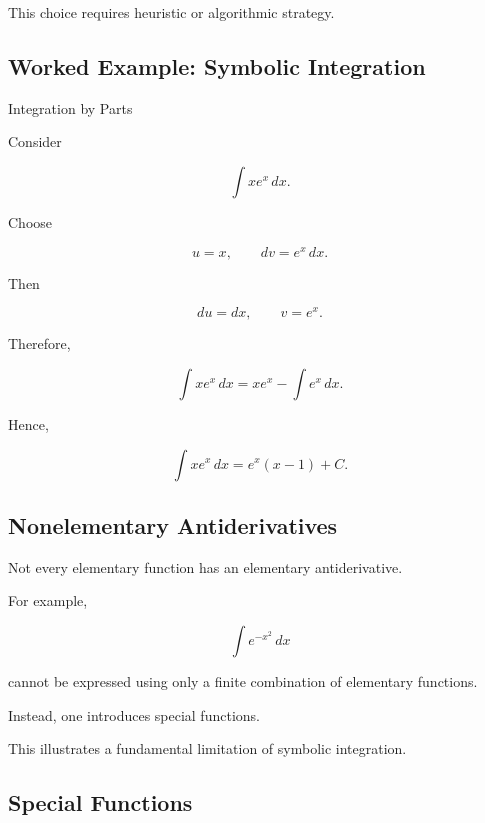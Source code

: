 This choice requires heuristic or algorithmic strategy.

\subsection{Worked Example: Symbolic Integration}
\label{subsec:worked-symbolic-integration}

\begin{workedexamplebox}{Integration by Parts}

Consider

\[
\int xe^x\,dx.
\]

Choose

\[
u=x,
\qquad
dv=e^x\,dx.
\]

Then

\[
du=dx,
\qquad
v=e^x.
\]

Therefore,

\[
\int xe^x\,dx
=
xe^x
-
\int e^x\,dx.
\]

Hence,

\begin{answerbox}
\[
\boxed{
\int xe^x\,dx
=
e^x(x-1)+C.
}
\]
\end{answerbox}

\end{workedexamplebox}

\subsection{Nonelementary Antiderivatives}
\label{subsec:nonelementary-antiderivatives}

Not every elementary function has an elementary antiderivative.

For example,

\[
\boxed{
\int e^{-x^2}\,dx
}
\]

cannot be expressed using only a finite combination of elementary
functions.

Instead, one introduces special functions.

This illustrates a fundamental limitation of symbolic integration.

\subsection{Special Functions}
\label{subsec:symbolic-special-functions}

